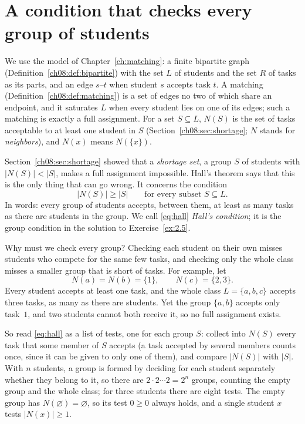 \section{A condition that checks every group of students}\label{ch09:sec:condition}
We use the model of Chapter~\ref{ch:matching}: a finite bipartite graph (Definition~\ref{ch08:def:bipartite}) with the set $L$ of students and the set $R$ of tasks as its parts, and an edge $s$--$t$ when student $s$ accepts task $t$. A matching (Definition~\ref{ch08:def:matching}) is a set of edges no two of which share an endpoint, and it saturates $L$ when every student lies on one of its edges; such a matching is exactly a full assignment. For a set $S\subseteq L$, $N(S)$ is the set of tasks acceptable to at least one student in $S$ (Section~\ref{ch08:sec:shortage}; $N$ stands for \emph{neighbors}), and $N(x)$ means $N(\{x\})$.

Section~\ref{ch08:sec:shortage} showed that a \emph{shortage set}, a group $S$ of students with $|N(S)|<|S|$, makes a full assignment impossible. Hall's theorem says that this is the only thing that can go wrong. It concerns the condition
\[
|N(S)|\ge |S|\qquad\text{for every subset }S\subseteq L.
\tag{H}\label{eq:hall}
\]
In words: every group of students accepts, between them, at least as many tasks as there are students in the group. We call \eqref{eq:hall} \emph{Hall's condition}; it is the group condition in the solution to Exercise~\ref{ex:2.5}.

Why must we check every group? Checking each student on their own misses students who compete for the same few tasks, and checking only the whole class misses a smaller group that is short of tasks. For example, let
\[
N(a)=N(b)=\{1\},\qquad N(c)=\{2,3\}.
\]
Every student accepts at least one task, and the whole class $L=\{a,b,c\}$ accepts three tasks, as many as there are students. Yet the group $\{a,b\}$ accepts only task~$1$, and two students cannot both receive it, so no full assignment exists.

So read \eqref{eq:hall} as a list of tests, one for each group $S$: collect into $N(S)$ every task that some member of $S$ accepts (a task accepted by several members counts once, since it can be given to only one of them), and compare $|N(S)|$ with $|S|$. With $n$ students, a group is formed by deciding for each student separately whether they belong to it, so there are $2\cdot2\cdots2=2^n$ groups, counting the empty group and the whole class; for three students there are eight tests. The empty group has $N(\varnothing)=\varnothing$, so its test $0\ge0$ always holds, and a single student $x$ tests $|N(x)|\ge1$.


